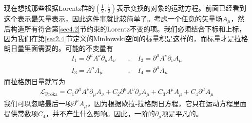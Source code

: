 现在想找那些根据Lorentz群的$(\frac{1}{2},\frac{1}{2})$表示变换的对象的运动方程。前面已经看到这个表示{\bf 是}矢量表示，因此这件事就比较简单了。考虑一个任意的矢量场$A_\mu$，然后构造所有符合第\ref{sec4.2}节约束的Lorentz不变的项。我们必须结合下标和上标，因为我们在第\ref{sec2.4}节定义的Minkowski空间的标量积是这样的，而标量才是拉格朗日量里面需要的。可能的不变量有
\[\begin{split}
I_1=\partial^\mu A^\nu\partial_\mu A_\nu\quad &,\quad I_2=\partial^\mu A^\nu\partial_\nu A_\mu\\
I_3=A^\mu A_\mu\quad &,\quad I_4=\partial^\mu A_\mu
\end{split}\]
而拉格朗日量就写为
\begin{align}\label{equ6.19}
\mathscr{L}_{\text{Proka}} = C_1\partial^\mu A^\nu\partial_\mu A_\nu+C_2\partial^\mu A^\nu\partial_\nu A_\mu+C_3A^\mu A_\mu+C_4\partial^\mu A_\mu
\end{align}
我们可以忽略最后一项$\partial^\mu A_\mu$，因为根据欧拉-拉格朗日方程，它只在运动方程里面提供常数项$C_4$，并不产生什么影响。因此，一阶的$\partial_\mu$项是平凡的。

